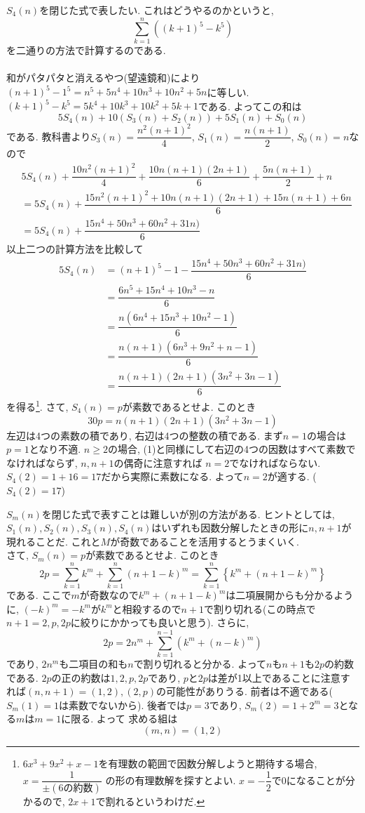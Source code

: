 $S_4(n)$を閉じた式で表したい. これはどうやるのかというと, 
\[\sum_{k=1}^{n}((k+1)^5 - k^5)\]
を二通りの方法で計算するのである. \\
 \\
和がパタパタと消えるやつ(望遠鏡和)により$(n+1)^5 - 1^5 = n^5 + 5n^4 + 10n^3 + 10n^2 + 5n$に等しい.\\
 $(k+1)^5 - k^5 = 5k^4 + 10k^3 + 10k^2 + 5k + 1$である. よってこの和は
\[5S_4(n) + 10(S_3(n) + S_2(n)) + 5S_1(n) + S_0(n)\]
である. 教科書より$S_3(n) = \dfrac{n^2(n+1)^2}{4}$, $S_1(n) = \dfrac{n(n+1)}{2}$, $S_0(n) = n$なので
{\small 
\begin{align*} 
&5S_4(n) +  \dfrac{10n^2(n+1)^2}{4} + \dfrac{10n(n+1)(2n+1)}{6} + \dfrac{5n(n+1)}{2} + n\\
&= 5S_4(n) + \dfrac{15n^2(n+1)^2 + 10n(n+1)(2n+1) + 15n(n+1) + 6n}{6} \\
&= 5S_4(n) + \dfrac{15n^4 + 50n^3 + 60n^2 + 31n)}{6}
\end{align*}
} 
以上二つの計算方法を比較して
\begin{align*} 
5S_4(n) &= (n+1)^5 - 1 - \dfrac{15n^4+50n^3 + 60n^2 +31n)}{6}\\
&= \dfrac{6n^5 + 15n^4 + 10n^3 - n}{6}\\
&= \dfrac{n(6n^4 + 15n^3 + 10n^2 - 1)}{6}\\
&= \dfrac{n(n+1)(6n^3 +9n^2 + n -1)}{6}\\
&= \dfrac{n(n+1)(2n+1)(3n^2 + 3n -1)}{6}
\end{align*}
を得る\footnote{$6x^3 + 9x^2 + x-1$を有理数の範囲で因数分解しようと期待する場合, $x=\dfrac{1}{\pm (6の約数)}$ の形の有理数解を探すとよい. $x=-\dfrac{1}{2}$で0になることが分かるので, $2x+1$で割れるというわけだ. }. 
さて, $S_4(n) = p$が素数であるとせよ. このとき
\[30p = n(n+1)(2n+1)(3n^2 + 3n - 1)\]
左辺は4つの素数の積であり, 右辺は4つの整数の積である. まず$n=1$の場合は$p=1$となり不適. $n\geq 2$の場合, (1)と同様にして右辺の4つの因数はすべて素数でなければならず, $n,n+1$の偶奇に注意すれば $n=2$でなければならない. $S_4(2) = 1+16 = 17$だから実際に素数になる. よって$n=2$が適する. ($S_4(2)=17$) 

$S_m(n)$を閉じた式で表すことは難しいが別の方法がある. ヒントとしては, $S_1(n),S_2(n),S_3(n),S_4(n)$はいずれも因数分解したときの形に$n,n+1$が現れることだ. これと$M$が奇数であることを活用するとうまくいく. \\
さて, $S_m(n) = p$が素数であるとせよ. このとき
\[2p = \sum_{k=1}^{n} k^m + \sum_{k=1}^{n} (n+1-k)^{m} = \sum_{k=1}^{n} \left\{ k^m + (n+1 -k)^m \right\}\]
である. ここで$m$が奇数なので$k^m + (n+1-k)^m$は二項展開からも分かるように, $(-k)^m = -k^m$が$k^m$と相殺するので$n+1$で割り切れる(この時点で$n+1=2,p,2p$に絞りにかかっても良いと思う). さらに, 
\[2p = 2n^m + \sum_{k=1}^{n-1} (k^m + (n - k)^m) \]
であり, $2n^m$も二項目の和も$n$で割り切れると分かる. よって$n$も$n+1$も$2p$の約数である. $2p$の正の約数は$1,2,p,2p$であり, $p$と$2p$は差が1以上であることに注意すれば$(n,n+1) = (1,2),(2,p)$の可能性がありうる. 前者は不適である(
 $S_m(1) = 1$は素数でないから). 後者では$p=3$であり, $S_m(2) = 1 + 2^m =  3$となる$m$は$m=1$に限る. よって 求める組は
\[(m,n) = (1,2)\]


